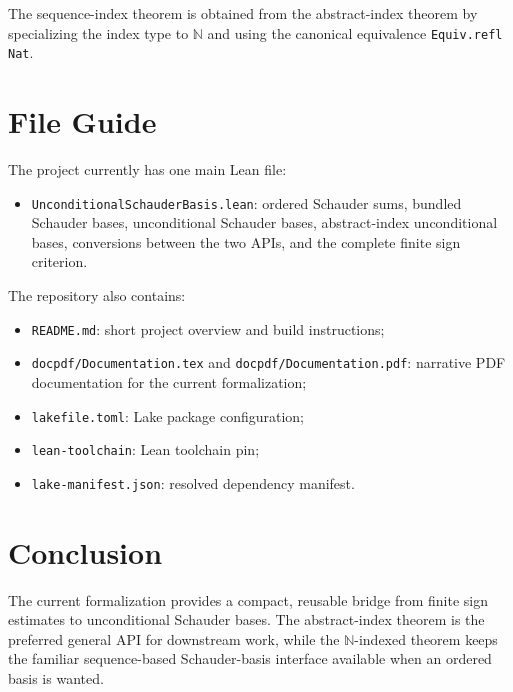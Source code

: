 \documentclass[12pt,a4paper]{article}
\theoremstyle{definition}
\newcommand{\Nat}{\mathbb{N}}
\begin{document}
The sequence-index theorem is obtained from the abstract-index theorem by
specializing the index type to $\Nat$ and using the canonical equivalence
\verb|Equiv.refl Nat|.

\newpage

\section{File Guide}

The project currently has one main Lean file:

\begin{itemize}
  \item \verb|UnconditionalSchauderBasis.lean|:
    ordered Schauder sums, bundled Schauder bases, unconditional
    Schauder bases, abstract-index unconditional bases, conversions between
    the two APIs, and the complete finite sign criterion.
\end{itemize}

The repository also contains:

\begin{itemize}
  \item \verb|README.md|:
    short project overview and build instructions;
  \item \verb|docpdf/Documentation.tex| and
    \verb|docpdf/Documentation.pdf|:
    narrative PDF documentation for the current formalization;
  \item \verb|lakefile.toml|:
    Lake package configuration;
  \item \verb|lean-toolchain|:
    Lean toolchain pin;
  \item \verb|lake-manifest.json|:
    resolved dependency manifest.
\end{itemize}

\section{Conclusion}

The current formalization provides a compact, reusable bridge from finite sign
estimates to unconditional Schauder bases.  The abstract-index theorem is the
preferred general API for downstream work, while the $\Nat$-indexed theorem
keeps the familiar sequence-based Schauder-basis interface available when an
ordered basis is wanted.
\end{document}

